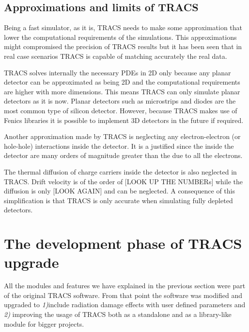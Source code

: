 \subsection{Approximations and limits of TRACS} %
\label{sec:approxTRACS}

Being a fast simulator, as it is, TRACS needs to make some approximation that lower the computational requirements of the simulations. This approximations might compromised the precision of TRACS results but it has been seen that in real case scenarios TRACS is capable of matching accurately the real data.

TRACS solves internally the necessary PDEs in 2D only because any planar detector can be approximated as being 2D and the computational requirements are higher with more dimensions. This means TRACS can only simulate planar detectors as it is now. Planar detectors such as microstrips and diodes are the most common type of silicon detector. However, because TRACS makes use of Fenics libraries it is possible to implement 3D detectors in the future if required.

Another approximation made by TRACS is neglecting any electron-electron (or hole-hole) interactions inside the detector. It is a justified since the  inside the detector are many orders of magnitude greater than the  due to all the electrons. 

The thermal diffusion of charge carriers inside the detector is also neglected in TRACS. Drift velocity is of the order of [LOOK UP THE NUMBERs] while the diffusion is only [LOOK AGAIN] and can be neglected. A consequence of this simplification is that TRACS is only accurate when simulating fully depleted detectors. 



\section{The development phase of TRACS upgrade} %
\label{sec:werk}

All the modules and features we have explained in the previous section were part of the original TRACS software. From that point the software was modified and upgraded to \emph{1)}include radiation damage effects  with user defined parameters and \emph{2)} improving the usage of TRACS both as a standalone and as a library-like module for bigger projects.


